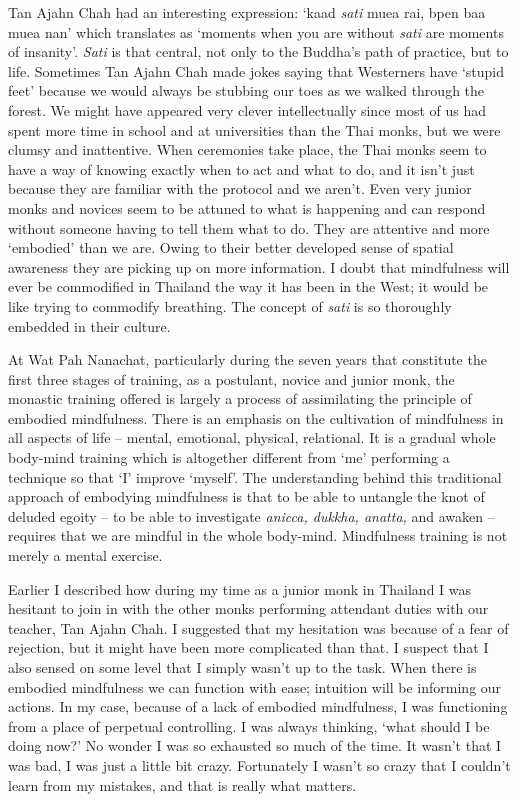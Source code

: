Tan Ajahn Chah had an interesting expression: `kaad \emph{sati} muea rai,
bpen baa muea nan' which translates as `moments when you are without
\emph{sati} are moments of insanity'. \emph{Sati} is that central, not only to the
Buddha's path of practice, but to life. Sometimes Tan Ajahn Chah made
jokes saying that Westerners have `stupid feet' because we would always
be stubbing our toes as we walked through the forest. We might have
appeared very clever intellectually since most of us had spent more time
in school and at universities than the Thai monks, but we were clumsy
and inattentive. When ceremonies take place, the Thai monks seem to have
a way of knowing exactly when to act and what to do, and it isn't just
because they are familiar with the protocol and we aren't. Even very
junior monks and novices seem to be attuned to what is happening and can
respond without someone having to tell them what to do. They are
attentive and more `embodied' than we are. Owing to their better
developed sense of spatial awareness they are picking up on more
information. I doubt that mindfulness will ever be commodified in
Thailand the way it has been in the West; it would be like trying to
commodify breathing. The concept of \emph{sati} is so thoroughly embedded in
their culture.

At Wat Pah Nanachat, particularly during the seven years that constitute
the first three stages of training, as a postulant, novice and junior
monk, the monastic training offered is largely a process of assimilating
the principle of embodied mindfulness. There is an emphasis on the
cultivation of mindfulness in all aspects of life -- mental, emotional,
physical, relational. It is a gradual whole body-mind training which is
altogether different from `me' performing a technique so that `I'
improve `myself'. The understanding behind this traditional approach of
embodying mindfulness is that to be able to untangle the knot of deluded
egoity -- to be able to investigate \emph{anicca, dukkha, anatta,} and awaken
-- requires that we are mindful in the whole body-mind. Mindfulness
training is not merely a mental exercise.

Earlier I described how during my time as a junior monk in Thailand I
was hesitant to join in with the other monks performing attendant duties
with our teacher, Tan Ajahn Chah. I suggested that my hesitation was
because of a fear of rejection, but it might have been more complicated
than that. I suspect that I also sensed on some level that I simply
wasn't up to the task. When there is embodied mindfulness we can
function with ease; intuition will be informing our actions. In my case,
because of a lack of embodied mindfulness, I was functioning from a
place of perpetual controlling. I was always thinking, `what should I be
doing now?' No wonder I was so exhausted so much of the time. It wasn't
that I was bad, I was just a little bit crazy. Fortunately I wasn't so
crazy that I couldn't learn from my mistakes, and that is really what
matters.

